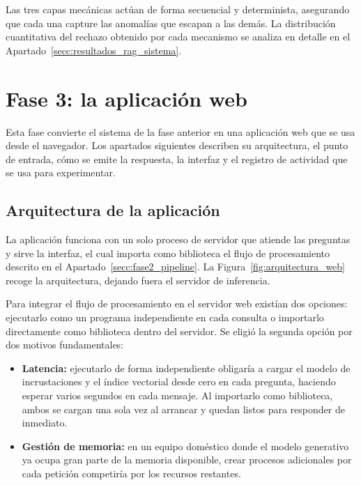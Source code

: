 Las tres capas mecánicas actúan de forma secuencial y determinista, asegurando que cada una capture las anomalías que escapan a las demás. La distribución cuantitativa del rechazo obtenido por cada mecanismo se analiza en detalle en el Apartado~\ref{secc:resultados_rag_sistema}.


\section[Fase 3: la aplicación web]{Fase 3: la aplicación web}
\label{secc:fase3}

Esta fase convierte el sistema de la fase anterior en una aplicación web que se usa desde el navegador. Los apartados siguientes describen su arquitectura, el punto de entrada, cómo se emite la respuesta, la interfaz y el registro de actividad que se usa para experimentar.

\subsection[Arquitectura de la aplicación]{Arquitectura de la aplicación}
\label{secc:fase3_arquitectura}

La aplicación funciona con un solo proceso de servidor que atiende las preguntas y sirve la interfaz, el cual importa como biblioteca el flujo de procesamiento descrito en el Apartado~\ref{secc:fase2_pipeline}. La Figura~\ref{fig:arquitectura_web} recoge la arquitectura, dejando fuera el servidor de inferencia.





Para integrar el flujo de procesamiento en el servidor web existían dos opciones: ejecutarlo como un programa independiente en cada consulta o importarlo directamente como biblioteca dentro del servidor. Se eligió la segunda opción por dos motivos fundamentales:
\begin{itemize}
  \item \textbf{Latencia:} ejecutarlo de forma independiente obligaría a cargar el modelo de incrustaciones y el índice vectorial desde cero en cada pregunta, haciendo esperar varios segundos en cada mensaje. Al importarlo como biblioteca, ambos se cargan una sola vez al arrancar y quedan listos para responder de inmediato.
  \item \textbf{Gestión de memoria:} en un equipo doméstico donde el modelo generativo ya ocupa gran parte de la memoria disponible, crear procesos adicionales por cada petición competiría por los recursos restantes.
\end{itemize}


